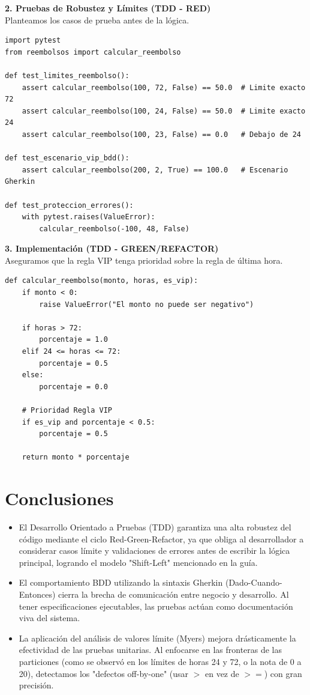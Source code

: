 \documentclass{article}
\begin{document}
\textbf{2. Pruebas de Robustez y Límites (TDD - RED)} \\
Planteamos los casos de prueba antes de la lógica.
\begin{lstlisting}[caption={lab2/test\_reembolsos.py (Fase RED)}]
import pytest
from reembolsos import calcular_reembolso

def test_limites_reembolso():
    assert calcular_reembolso(100, 72, False) == 50.0  # Limite exacto 72
    assert calcular_reembolso(100, 24, False) == 50.0  # Limite exacto 24
    assert calcular_reembolso(100, 23, False) == 0.0   # Debajo de 24

def test_escenario_vip_bdd():
    assert calcular_reembolso(200, 2, True) == 100.0   # Escenario Gherkin

def test_proteccion_errores():
    with pytest.raises(ValueError):
        calcular_reembolso(-100, 48, False)
\end{lstlisting}

\textbf{3. Implementación (TDD - GREEN/REFACTOR)} \\
Aseguramos que la regla VIP tenga prioridad sobre la regla de última hora.
\begin{lstlisting}[caption={lab2/reembolsos.py (Fase GREEN/REFACTOR)}]
def calcular_reembolso(monto, horas, es_vip):
    if monto < 0:
        raise ValueError("El monto no puede ser negativo")
        
    if horas > 72:
        porcentaje = 1.0
    elif 24 <= horas <= 72:
        porcentaje = 0.5
    else:
        porcentaje = 0.0
        
    # Prioridad Regla VIP
    if es_vip and porcentaje < 0.5:
        porcentaje = 0.5
        
    return monto * porcentaje
\end{lstlisting}

\section{Conclusiones}
\begin{itemize}
    \item El Desarrollo Orientado a Pruebas (TDD) garantiza una alta robustez del código mediante el ciclo Red-Green-Refactor, ya que obliga al desarrollador a considerar casos límite y validaciones de errores antes de escribir la lógica principal, logrando el modelo "Shift-Left" mencionado en la guía.
    \item El comportamiento BDD utilizando la sintaxis Gherkin (Dado-Cuando-Entonces) cierra la brecha de comunicación entre negocio y desarrollo. Al tener especificaciones ejecutables, las pruebas actúan como documentación viva del sistema.
    \item La aplicación del análisis de valores límite (Myers) mejora drásticamente la efectividad de las pruebas unitarias. Al enfocarse en las fronteras de las particiones (como se observó en los límites de horas 24 y 72, o la nota de 0 a 20), detectamos los "defectos off-by-one" (usar $>$ en vez de $>=$) con gran precisión.
\end{itemize}
\end{document}
